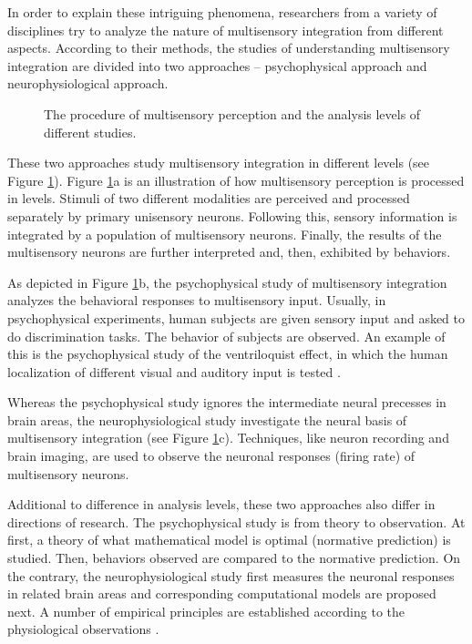 \documentclass{article}[11pt]
\newcommand{\inputTikZ}[1]{%
}
\begin{document}
In order to explain these intriguing phenomena, researchers from a variety of disciplines try to analyze the nature of multisensory integration from different aspects. According to their methods, the studies of understanding multisensory integration are divided into two approaches -- psychophysical approach and neurophysiological approach.

\begin{figure}[tpb]
  \centering \inputTikZ{flow}
  \caption{The procedure of multisensory perception and the analysis levels of different studies.}
  \label{fig:flow}
\end{figure}

These two approaches study multisensory integration in different levels (see Figure \ref{fig:flow}).
Figure \ref{fig:flow}a is an illustration of how multisensory perception is processed in levels. Stimuli of two different modalities are perceived and processed separately by primary unisensory neurons. Following this, sensory information is integrated by a population of multisensory neurons. Finally, the results of the multisensory neurons are further interpreted and, then, exhibited by behaviors.

As depicted in Figure \ref{fig:flow}b, the psychophysical study of multisensory integration analyzes the behavioral responses to multisensory input. Usually, in psychophysical experiments, human subjects are given sensory input and asked to do discrimination tasks. The behavior of subjects are observed. An example of this is the psychophysical study of the ventriloquist effect, in which the human localization of different visual and auditory input is tested \cite{alais_ventriloquist_2004}.

Whereas the psychophysical study ignores the intermediate neural precesses in brain areas, the neurophysiological study investigate the neural basis of multisensory integration (see Figure \ref{fig:flow}c). Techniques, like neuron recording and brain imaging, are used to observe the neuronal responses (firing rate) of multisensory neurons.

Additional to difference in analysis levels, these two approaches also differ in directions of research. The psychophysical study is from theory to observation. At first, a theory of what mathematical model is optimal (normative prediction) is studied. Then, behaviors observed are compared to the normative prediction. On the contrary, the neurophysiological study first measures the neuronal responses in related brain areas and corresponding computational models are proposed next. A number of empirical principles are established according to the physiological observations \cite{stein_merging_1993, stanford_evaluating_2005}.
\end{document}

